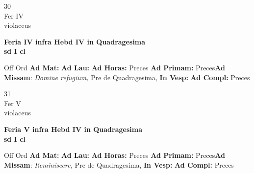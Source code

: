 \documentclass[10pt, openany]{book}
\begin{document}
    \begin{center}
        \begin{minipage}{3.5in}
            \vspace{2em}
            \begin{minipage}{0.5in}
                {\Huge 30} \\
                {\normalsize Fer IV} \\
                {\normalsize violaceus}
            \end{minipage}
            \begin{minipage}{3.0in}
                \textbf{ \large Feria IV infra Hebd IV in Quadragesima  \\
                \textnormal{\normalsize sd I cl}} \\ 
            \end{minipage}
            \begin{justify}Off Ord
                \textbf{Ad Mat: }
                \textbf{Ad Lau: }
                \textbf{Ad Horas: }Preces
                \textbf{Ad Primam: }Preces\textbf{Ad Missam}: \textit{Domine refugium,} Pre de Quadragesima,  
                \textbf{In Vesp: }
                \textbf{Ad Compl: }Preces
            \end{justify}
        \end{minipage}
    \end{center}

    \begin{center}
        \begin{minipage}{3.5in}
            \vspace{2em}
            \begin{minipage}{0.5in}
                {\Huge 31} \\
                {\normalsize Fer V} \\
                {\normalsize violaceus}
            \end{minipage}
            \begin{minipage}{3.0in}
                \textbf{ \large Feria V infra Hebd IV in Quadragesima  \\
                \textnormal{\normalsize sd I cl}} \\ 
            \end{minipage}
            \begin{justify}Off Ord
                \textbf{Ad Mat: }
                \textbf{Ad Lau: }
                \textbf{Ad Horas: }Preces
                \textbf{Ad Primam: }Preces\textbf{Ad Missam}: \textit{Reminíscere,} Pre de Quadragesima,  
                \textbf{In Vesp: }
                \textbf{Ad Compl: }Preces
            \end{justify}
        \end{minipage}
    \end{center}
\end{document}
